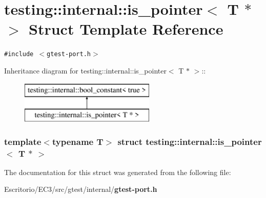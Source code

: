 \section{testing::internal::is\_\-pointer$<$ T $\ast$ $>$ Struct Template Reference}
\label{structtesting_1_1internal_1_1is__pointer_3_01T_01_5_01_4}
{\tt \#include $<$gtest-port.h$>$}

Inheritance diagram for testing::internal::is\_\-pointer$<$ T $\ast$ $>$::\begin{figure}[H]
\begin{center}
\leavevmode
\includegraphics[height=2cm]{structtesting_1_1internal_1_1is__pointer_3_01T_01_5_01_4}
\end{center}
\end{figure}
\subsubsection*{template$<$typename T$>$ struct testing::internal::is\_\-pointer$<$ T $\ast$ $>$}



The documentation for this struct was generated from the following file:\begin{CompactItemize}
\item 
Escritorio/EC3/src/gtest/internal/{\bf gtest-port.h}\end{CompactItemize}
